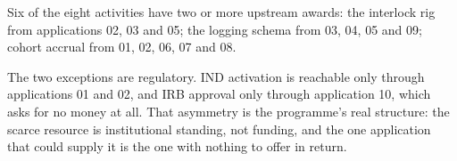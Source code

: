 Six of the eight activities have two or more upstream awards: the interlock rig
from applications 02, 03 and 05; the logging schema from 03, 04, 05 and 09;
cohort accrual from 01, 02, 06, 07 and 08.

The two exceptions are regulatory. IND activation is reachable only through
applications 01 and 02, and IRB approval only through application 10, which asks
for no money at all. That asymmetry is the programme's real structure: the
scarce resource is institutional standing, not funding, and the one application
that could supply it is the one with nothing to offer in return.

